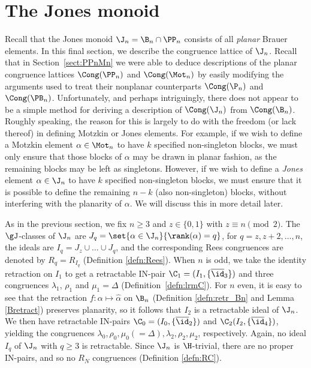\section{The Jones monoid }\label{sec:Jn}




Recall that the Jones monoid $\J_n=\B_n\cap\PP_n$ consists of all \emph{planar} Brauer elements.
In this final section, we describe the congruence lattice of $\J_n$.  Recall that in Section~\ref{sect:PPnMn} we were able to deduce descriptions of the planar congruence lattices $\Cong(\PP_n)$ and $\Cong(\Mot_n)$ by easily modifying the arguments used to treat their nonplanar counterparts $\Cong(\P_n)$ and $\Cong(\PB_n)$.  Unfortunately, and perhaps intriguingly, there does not appear to be a simple method for deriving a description of $\Cong(\J_n)$ from $\Cong(\B_n)$.  Roughly speaking, the reason for this is largely to do with the freedom (or lack thereof) in defining Motzkin or Jones elements.  For example, if we wish to define a Motzkin element $\alpha\in\Mot_n$ to have $k$ specified non-singleton blocks, we must only ensure that those blocks of $\alpha$ may be drawn in planar fashion, as the remaining blocks may be left as singletons.  However, if we wish to define a \emph{Jones} element $\alpha\in\J_n$ to have $k$ specified non-singleton blocks, we must ensure that it is possible to define the remaining $n-k$ (also non-singleton) blocks, without interfering with the planarity of $\alpha$.  We will discuss this in more detail later.




As in the previous section, we fix $n\geq3$ and $z\in\{0,1\}$ with $z\equiv n\pmod{2}$.
The $\gJ$-classes of $\J_n$ are $J_q=\set{\alpha\in\J_n}{\rank(\alpha)=q}$, for
$q=z,z+2,\dots,n$, the ideals are $I_q=J_z\cup\dots\cup J_q$, and the corresponding Rees congruences are denoted by $R_q=R_{I_q}$ (Definition \ref{defn:Rees}).
When $n$ is odd, we take the identity retraction on $I_1$ to get a retractable IN-pair $\C_1=(I_1,\{\overline{\id}_3\})$ and three congruences $\lambda_1$, $\rho_1$ and $\mu_1=\Delta$ (Definition~\ref{defn:lrmC}).
For $n$ even, it is easy to see that the retraction $f:\alpha\mapsto\widehat{\alpha}$ on $\B_n$ (Definition \ref{defn:retr_Bn} and Lemma \ref{Bretract}) preserves planarity, so it follows that $I_2$ is a retractable ideal of $\J_n$.
We then have retractable IN-pairs $\C_0=(I_0,\{\overline{\id}_2\})$
and $\C_2(I_2,\{\overline{\id}_4\})$, yielding the congruences $\lambda_0,\rho_0,\mu_0(=\Delta),\lambda_2,\rho_2,\mu_2$, respectively.  Again, no ideal $I_q$ of $\J_n$ with $q\geq3$ is retractable.  Since $\J_n$ is $\H$-trivial, there are no proper IN-pairs, and so no $R_N$ congruences (Definition \ref{defn:RC}).

